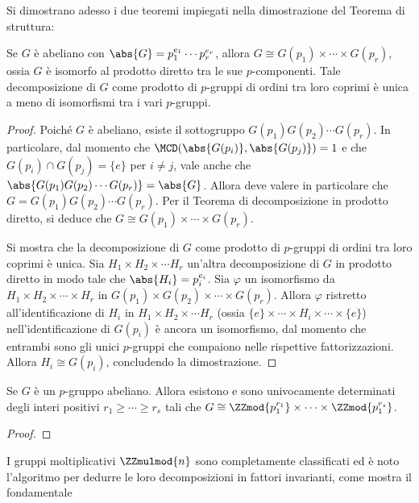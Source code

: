 \documentclass[12pt]{scrartcl}
\begin{document}
	Si dimostrano adesso i due teoremi impiegati nella dimostrazione
	del Teorema di struttura:
	
	\begin{theorem}
		Se $G$ è abeliano con $\abs{G} = p_1^{e_1} \cdots p_r^{e_r}$, allora $G \cong G(p_1) \times \cdots \times G(p_r)$, ossia $G$ è isomorfo al prodotto diretto tra
		le sue $p$-componenti. Tale decomposizione di $G$
		come prodotto di $p$-gruppi di ordini tra loro
		coprimi è unica a meno di isomorfismi tra i vari $p$-gruppi.
	\end{theorem}
	
	\begin{proof}
		Poiché $G$ è abeliano, esiste il sottogruppo $G(p_1) G(p_2) \cdots G(p_r)$.
		In particolare, dal momento che $\MCD(\abs{G(p_i)}, \abs{G(p_j)}) = 1$ e che
		$G(p_i) \cap G(p_j) = \{e\}$ per
		$i \neq j$, vale anche che $\abs{G(p_1) G(p_2) \cdots G(p_r)} = \abs{G}$.
		Allora deve valere in particolare che $G = G(p_1) G(p_2) \cdots G(p_r)$. Per
		il Teorema di decomposizione in prodotto diretto, si deduce che
		$G \cong G(p_1) \times \cdots \times G(p_r)$. \medskip
		
		
		Si mostra che la decomposizione di $G$ come prodotto di $p$-gruppi di ordini
		tra loro coprimi è unica. Sia $H_1 \times H_2 \times \cdots H_r$ un'altra
		decomposizione di $G$ in prodotto diretto in modo tale che $\abs{H_i} = p_i^{e_i}$.
		Sia $\varphi$ un isomorfismo da $H_1 \times H_2 \times \cdots \times H_r$ in
		$G(p_1) \times G(p_2) \times \cdots \times G(p_r)$. Allora $\varphi$ ristretto
		all'identificazione di $H_i$ in $H_1 \times H_2 \times \cdots H_r$ (ossia
		$\{e\} \times \cdots \times H_i \times \cdots \times \{e\}$) nell'identificazione
		di $G(p_i)$ è ancora un isomorfismo, dal momento che entrambi sono gli unici
		$p$-gruppi che compaiono nelle rispettive fattorizzazioni. Allora
		$H_i \cong G(p_i)$, concludendo la dimostrazione.
	\end{proof}
	
	\begin{theorem}
		Se $G$ è un $p$-gruppo abeliano. Allora esistono
		e sono univocamente determinati degli interi
		positivi $r_1 \geq \cdots \geq r_s$ tali che
		$G \cong \ZZmod{p_1^{r_1}} \times \cdots
		\times \ZZmod{p_1^{r_s}}$.
	\end{theorem}
	
	\begin{proof}
	\end{proof} \bigskip
	
	I gruppi moltiplicativi $\ZZmulmod{n}$ sono completamente classificati ed
	è noto l'algoritmo per dedurre le loro decomposizioni in fattori invarianti,
	come mostra il fondamentale
	
\end{document}
